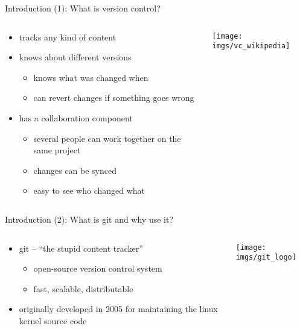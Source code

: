 \begin{frame}{Introduction (1): What is version control?}
  \begin{columns}[onlytextwidth]
    \begin{column}{0.6\textwidth}
      \begin{itemize}
          \item tracks any kind of content
          \item knows about different versions
          \begin{itemize}
            \item knows what was changed when
            \item can revert changes if something goes wrong
          \end{itemize}
          \item has a collaboration component
          \begin{itemize}
            \item several people can work together on the same project
            \item changes can be synced
            \item easy to see who changed what
          \end{itemize}
        \end{itemize}
    \end{column}
    \begin{column}[t]{0.4\textwidth}
      \texttt{[image: imgs/vc\_wikipedia]}
    \end{column}
  \end{columns}
\end{frame}

\begin{frame}{Introduction (2): What is git and why use it?}
  \begin{columns}[onlytextwidth]
    \begin{column}{0.6\textwidth}
      \begin{itemize}
        \item git -- ``the stupid content tracker''
        \begin{itemize}
          \item open-source version control system
          \item fast, scalable, distributable
        \end{itemize}
        \item originally developed in 2005 for maintaining the linux kernel source code
      \end{itemize}
    \end{column}
    \begin{column}[t]{0.4\textwidth}
      \texttt{[image: imgs/git\_logo]}
    \end{column}
  \end{columns}
\end{frame}

